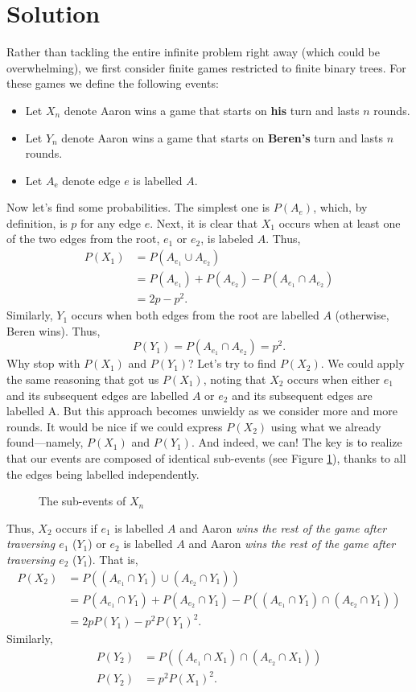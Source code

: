 \documentclass{book}
\begin{document}
\section{Solution}\label{solution}
Rather than tackling the entire infinite problem right away (which could be overwhelming), we first consider finite games restricted to finite binary trees. For these games we define the following events:
\begin{itemize}
\item Let $X_n$ denote Aaron wins a game that starts on \textbf{his} turn and lasts $n$ rounds.
\item Let $Y_n$ denote Aaron wins a game that starts on \textbf{Beren's} turn and lasts $n$ rounds.
\item Let $A_{\text{e}}$ denote edge $e$ is labelled $A$.
\end{itemize}
Now let's find some probabilities. The simplest one is $P(A_{e})$, which, by definition, is $p$ for any edge $e$. Next, it is clear that $X_1$ occurs when at least one of the two edges from the root, $e_1$ or $e_2$, is labeled $A$. Thus,
\begin{align*}
P(X_1) &= P(A_{e_1} \cup A_{e_2})\\
&= P(A_{e_1}) + P(A_{e_2})- P(A_{e_1} \cap A_{e_2})\\
&= 2p - p^2.
\end{align*}
Similarly, $Y_1$ occurs when both edges from the root are labelled $A$ (otherwise, Beren wins). Thus,
\[P(Y_1) = P(A_{e_1} \cap A_{e_2}) = p^2.\]
Why stop with $P(X_1)$ and $P(Y_1)$? Let's try to find $P(X_2)$. We could apply the same reasoning that got us $P(X_1)$, noting that $X_2$ occurs when either $e_1$ and its subsequent edges are labelled $A$ or $e_2$ and its subsequent edges are labelled A. But this approach becomes unwieldy as we consider more and more rounds. It would be nice if we could express $P(X_2)$ using what we already found---namely, $P(X_1)$ and $P(Y_1)$. And indeed, we can! The key is to realize that our events are composed of identical sub-events (see Figure \ref{subgames}), thanks to all the edges being labelled independently.
\begin{figure}[ht]
\centering

\caption{The sub-events of $X_n$}
\label{subgames}
\end{figure}

Thus, $X_2$ occurs if $e_1$ is labelled $A$ and Aaron \emph{wins the rest of the game after traversing $e_1$} ($Y_1$) or $e_2$ is labelled $A$ and Aaron \emph{wins the rest of the game after traversing $e_2$} ($Y_1$). That is,
\begin{align*}
P(X_2) &= P((A_{e_1} \cap Y_1) \cup (A_{e_2} \cap Y_1))\\
&= P(A_{e_1} \cap Y_1) + P(A_{e_2} \cap Y_1) - P((A_{e_1} \cap Y_1) \cap (A_{e_2} \cap Y_1))\\
&= 2pP(Y_1) - p^2P(Y_1)^2.
\end{align*}
Similarly,
\begin{align*}
P(Y_2) &= P((A_{e_1} \cap X_1) \cap (A_{e_2} \cap X_1))\\ 
P(Y_2) &= p^2P(X_{1})^2.
\end{align*}
\end{document}

